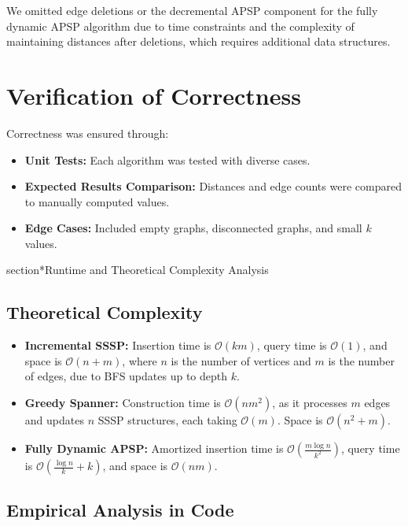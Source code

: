 \documentclass[12pt]{article}
\begin{document}
We omitted edge deletions or the decremental APSP component for the fully dynamic APSP algorithm due to time constraints and the complexity of maintaining distances after deletions, which requires additional data structures.

\section*{Verification of Correctness}

Correctness was ensured through:
\begin{itemize}
    \item \textbf{Unit Tests:} Each algorithm was tested with diverse cases.
    \item \textbf{Expected Results Comparison:} Distances and edge counts were compared to manually computed values.
    \item \textbf{Edge Cases:} Included empty graphs, disconnected graphs, and small $k$ values.
\end{itemize}

section*{Runtime and Theoretical Complexity Analysis}

\subsection*{Theoretical Complexity}

\begin{itemize}
    \item \textbf{Incremental SSSP:} Insertion time is $\mathcal{O}(km)$, query time is $\mathcal{O}(1)$, and space is $\mathcal{O}(n + m)$, where $n$ is the number of vertices and $m$ is the number of edges, due to BFS updates up to depth $k$.
    
    \item \textbf{Greedy Spanner:} Construction time is $\mathcal{O}(nm^2)$, as it processes $m$ edges and updates $n$ SSSP structures, each taking $\mathcal{O}(m)$. Space is $\mathcal{O}(n^2 + m)$.
    
    \item \textbf{Fully Dynamic APSP:} Amortized insertion time is $\mathcal{O}\left( \frac{m \log n}{k^2} \right)$, query time is $\mathcal{O}\left( \frac{\log n}{k} + k \right)$, and space is $\mathcal{O}(nm)$.
\end{itemize}

\subsection*{Empirical Analysis in Code}
\end{document}
